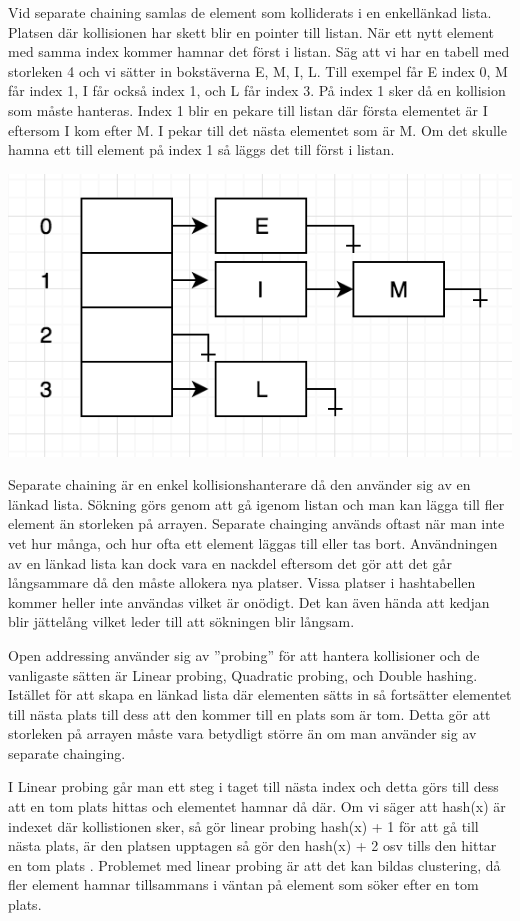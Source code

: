 \documentclass[a5paper,10pt,oneside]{article}
\begin{document}
Vid separate chaining samlas de element som kolliderats i en enkellänkad lista. Platsen där kollisionen har skett blir en pointer till listan. När ett nytt element med samma index kommer hamnar det först i listan. Säg att vi har en tabell med storleken 4 och vi sätter in bokstäverna E, M, I, L. Till exempel får E index 0, M får index 1, I får också index 1,  och L får index 3. På index 1 sker då en kollision som måste hanteras. Index 1 blir en pekare till listan där första elementet är I eftersom I kom efter M. I pekar till det nästa elementet som är M. Om det skulle hamna ett till element på index 1 så läggs det till först i listan.

\includegraphics[scale=1]{separate}

Separate chaining är en enkel kollisionshanterare då den använder sig av en länkad lista. Sökning görs genom att gå igenom listan och man kan lägga till fler element än storleken på arrayen. Separate chainging används oftast när man inte vet hur många, och hur ofta ett element läggas till eller tas bort. Användningen av en länkad lista kan dock vara en nackdel eftersom det gör att det går långsammare då den måste allokera nya platser. Vissa platser i hashtabellen kommer heller inte användas vilket är onödigt. Det kan även hända att kedjan blir jättelång vilket leder till att sökningen blir långsam.

Open addressing använder sig av ”probing” för att hantera kollisioner och de vanligaste sätten är Linear probing, Quadratic probing, och Double hashing. Istället för att skapa en länkad lista där elementen sätts in så fortsätter elementet till nästa plats till dess att den kommer till en plats som är tom. Detta gör att storleken på arrayen måste vara betydligt större än om man använder sig av separate chainging.

 I Linear probing går man ett steg i taget till nästa index och detta görs till dess att en tom plats hittas och elementet hamnar då där. Om vi säger att hash(x) är indexet där kollistionen sker, så gör linear probing hash(x) + 1 för att gå till nästa plats, är den platsen upptagen så gör den hash(x) + 2 osv tills den hittar en tom plats . Problemet med linear probing är att det kan bildas clustering, då fler element hamnar tillsammans i väntan på element som söker efter en tom plats. 
 
\end{document}
